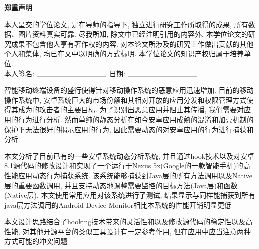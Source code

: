


\newpage
\vspace*{20pt}
\begin{center}{\textbf{\songti{} 郑重声明}}\end{center}
\par\vspace*{30pt}
\renewcommand{\baselinestretch}{2}

{%

本人呈交的学位论文, 是在导师的指导下, 独立进行研究工作所取得的成果,
所有数据、图片资料真实可靠. 尽我所知, 除文中已经注明引用的内容外,
本学位论文的研究成果不包含他人享有著作权的内容.
对本论文所涉及的研究工作做出贡献的其他个人和集体,
均已在文中以明确的方式标明. 本学位论文的知识产权归属于培养单位.\\[2cm]

\hspace*{1cm}本人签名: $\underline{\hspace{3.5cm}}$
\hspace{2cm}日期: $\underline{\hspace{3.5cm}}$\hfill\par}
\baselineskip=23pt  %





\begin{cnabstract}
智能移动终端设备的盛行使得针对移动操作系统的恶意应用迅速增加. 目前的移动操作系统中, 安卓系统巨大的市场份额和其相对开放的应用分发和权限管理方式使得其成为的攻击者的主要目标. 为了识别出恶意应用并阻止其传播, 我们需要对应用的行为进行分析. 然而单纯的静态分析在如今安卓应用成熟的混淆和加壳机制的保护下无法很好的揭示应用的行为, 因此需要动态的对安卓应用的行为进行捕获和分析\juhao 

本文分析了目前已有的一些安卓系统动态分析系统, 并且通过hook技术以及对安卓8.1源代码的修改设计和实现了一个运行于Nexus 5x(Google的一款智能手机)的高性能应用动态行为捕获系统. 该系统能够捕获到Java层的所有方法调用以及Native层的重要函数调用, 并且支持动态地调整需要监控的目标方法(Java层)和函数(Native层). 本文使用常用应用对该系统进行了测试, 结果显示与同样能捕获到所有java层方法调用的Android Device Monitor相比本系统的性能开销明显更低\juhao 

本文设计思路结合了hooking技术带来的灵活性和以及修改源代码的稳定性以及高性能, 对其他开源平台的类似工具设计有一定参考作用, 但在应用中应当注意两种方式可能的冲突问题\juhao 




\end{cnabstract}
\par
\vspace*{2em}


